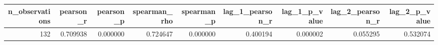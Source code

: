\begin{tabular}{rrrrrrrrr}
\toprule
n\_observations & pearson\_r & pearson\_p & spearman\_rho & spearman\_p & lag\_1\_pearson\_r & lag\_1\_p\_value & lag\_2\_pearson\_r & lag\_2\_p\_value \\
\midrule
132 & 0.709938 & 0.000000 & 0.724647 & 0.000000 & 0.400194 & 0.000002 & 0.055295 & 0.532074 \\
\bottomrule
\end{tabular}
